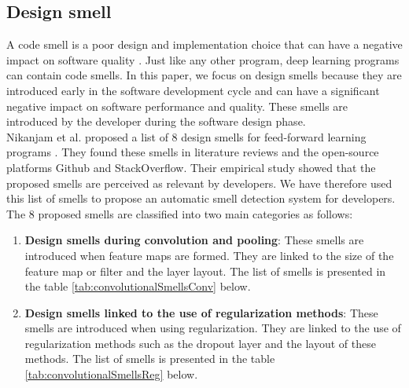 \subsection{Design smell}
\label{sec:codeSmell}
A code smell is a poor design and implementation choice that can have a negative impact on software quality \cite{fowler1997refactoring}. Just like any other program, deep learning programs can contain code smells. In this paper, we focus on design smells because they are introduced early in the software development cycle and can have a significant negative impact on software performance and quality. These smells are introduced by the developer during the software design phase.\\ Nikanjam et al. proposed a list of 8 design smells for feed-forward learning programs \cite{nikanjam2019deep}. They found these smells in literature reviews and the open-source platforms Github and StackOverflow. Their empirical study showed that the proposed smells are perceived as relevant by developers. We have therefore used this list of smells to propose an automatic smell detection system for developers.\\ The 8 proposed smells are classified into two main categories as follows:
\begin{enumerate}
    \item \textbf{Design smells during convolution and pooling}: These smells are
          introduced when feature maps are formed. They are linked to the size of the
          feature map or filter and the layer layout. The list of smells is presented in
          the table \ref{tab:convolutionalSmellsConv} below.
    \item \textbf{Design smells linked to the use of regularization methods}: These
          smells are introduced when using regularization. They are linked to the use of
          regularization methods such as the dropout layer and the layout of these
          methods. The list of smells is presented in the table
          \ref{tab:convolutionalSmellsReg} below.
\end{enumerate}



